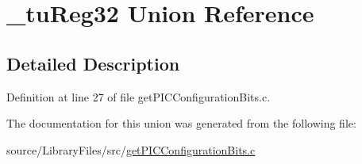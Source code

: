 \hypertarget{union__tu_reg32}{}\section{\+\_\+tu\+Reg32 Union Reference}
\label{union__tu_reg32}


\subsection{Detailed Description}


Definition at line 27 of file get\+P\+I\+C\+Configuration\+Bits.\+c.



The documentation for this union was generated from the following file\+:\begin{DoxyCompactItemize}
\item 
source/\+Library\+Files/src/\hyperlink{get_p_i_c_configuration_bits_8c}{get\+P\+I\+C\+Configuration\+Bits.\+c}\end{DoxyCompactItemize}
